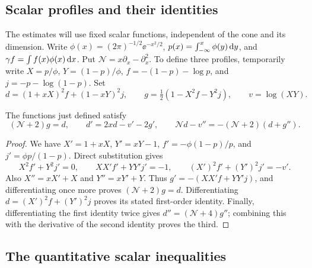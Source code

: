 \subsection{Scalar profiles and their identities}
The estimates will use fixed scalar functions, independent of the cone and its dimension. Write $\phi(x)=(2\pi)^{-1/2}\ee^{-x^2/2}$, $p(x)=\int_{-\infty}^x\phi(y)\,\mathrm{d} y$, and $\gamma f=\int f(x)\phi(x)\,\mathrm{d} x$. Put $\mathcal{N}=x\partial_x-\partial_x^2$. To define three profiles, temporarily write $X=p/\phi$, $Y=(1-p)/\phi$, $f=-(1-p)-\log p$, and $j=-p-\log(1-p)$. Set
\[
 d=(1+xX)^2 f+(1-xY)^2 j,\qquad
 g=\tfrac12(1-X^2 f-Y^2 j),\qquad v=\log(XY).
\]
\begin{lemma}\label{lem:profile-identities}
The functions just defined satisfy
\begin{equation}
 (\mathcal{N}+2)g=d,\qquad d'=2xd-v'-2g',\qquad
 \mathcal{N} d-v''=-(\mathcal{N}+2)(d+g'').                          \label{eq:gaussian-profile-identities}
\end{equation}
\end{lemma}
\begin{proof}
We have $X'=1+xX$, $Y'=xY-1$, $f'=-\phi(1-p)/p$, and $j'=\phi p/(1-p)$. Direct substitution gives
\[
X^2f'+Y^2j'=0,\qquad XX'f'+YY'j'=-1,\qquad
(X')^2f'+(Y')^2j'=-v'.
\]
Also $X''=xX'+X$ and $Y''=xY'+Y$. Thus $g'=-(XX'f+YY'j)$, and differentiating once more proves $(\mathcal{N}+2)g=d$. Differentiating $d=(X')^2f+(Y')^2j$ proves its stated first-order identity. Finally, differentiating the first identity twice gives $d''=(\mathcal{N}+4)g''$; combining this with the derivative of the second identity proves the third.
\end{proof}

\subsection{The quantitative scalar inequalities}

